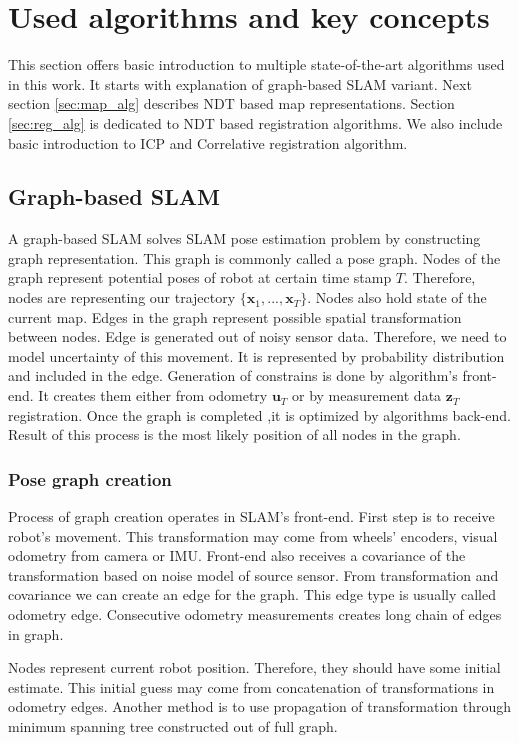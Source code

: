 \chapter{Used algorithms and key concepts}
This section offers basic introduction to multiple state-of-the-art algorithms used in this work. It starts with explanation of graph-based SLAM variant. Next section \ref{sec:map_alg} describes \gls{NDT} based map representations. Section \ref{sec:reg_alg} is dedicated to \gls{NDT} based registration algorithms. We also include basic introduction to \gls{ICP} and Correlative registration algorithm.   

\section{Graph-based SLAM}
\label{sec:graph_base_slam}
A graph-based SLAM solves SLAM pose estimation problem by constructing graph representation. This graph is commonly called a pose graph. Nodes of the graph represent potential poses of robot at certain time stamp $ T $. Therefore, nodes are representing our trajectory $ \{\textbf{x}_{1},...,\textbf{x}_{T}\} $. Nodes also hold state of the current map. Edges in the graph represent possible spatial transformation between nodes. Edge is generated out of noisy sensor data. Therefore, we need to model uncertainty of this movement. It is represented by probability distribution and included in the edge. Generation of constrains is done by algorithm's front-end. It creates them either from odometry $  \textbf{u}_{T} $ or by measurement data  $ \textbf{z}_{T} $ registration. Once the graph is completed ,it is optimized by algorithms back-end. Result of this process is the most likely position of all nodes in the graph.

\subsection {Pose graph creation}
\label{Pose_graph_creation}
Process of graph creation operates in \gls{SLAM}'s front-end. First step is to receive robot's movement. This transformation may come from wheels' encoders, visual odometry from camera or \gls{IMU}. Front-end also receives a covariance of the transformation based on noise model of source sensor. From transformation and covariance we can create an edge for the graph. This edge type is usually called odometry edge. Consecutive odometry measurements creates long chain of edges in graph.

Nodes represent current robot position. Therefore, they should have some initial estimate. This initial guess may come from concatenation of transformations in odometry edges. Another method is to use propagation of transformation through minimum spanning tree constructed out of full graph. 

